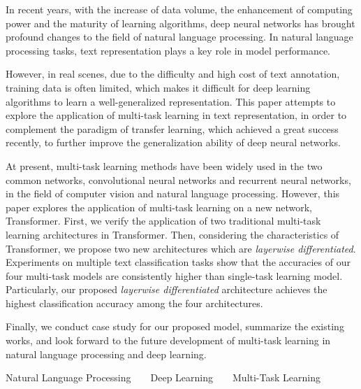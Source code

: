 \begin{eabstract}
	In recent years, with the increase of data volume, the enhancement of computing power and the maturity of learning algorithms, deep neural networks has brought profound changes to the field of natural language processing. In natural language processing tasks, text representation plays a key role in model performance.
	
	However, in real scenes, due to the difficulty and high cost of text annotation, training data is often limited, which makes it difficult for deep learning algorithms to learn a well-generalized representation. This paper attempts to explore the application of multi-task learning in text representation, in order to complement the paradigm of transfer learning, which achieved a great success recently, to further improve the generalization ability of deep neural networks.
	
	At present, multi-task learning methods have been widely used in the two common networks, convolutional neural networks and recurrent neural networks, in the field of computer vision and natural language processing. However, this paper explores the application of multi-task learning on a new network, Transformer. First, we verify the application of two traditional multi-task learning architectures in Transformer. Then, considering the characteristics of Transformer, we propose two new architectures which are \textit{layerwise differentiated}. Experiments on multiple text classification tasks show that the accuracies of our four multi-task models are consistently higher than single-task learning model. Particularly, our proposed \textit{layerwise differentiated} architecture achieves the highest classification accuracy among the four architectures.
	
	
	Finally, we conduct case study for our proposed model, summarize the existing works, and look forward to the future development of multi-task learning in natural language processing and deep learning.
	
	
\end{eabstract}


\begin{ekeywords}
	Natural Language Processing\ \ \ \ Deep Learning\ \ \ \ Multi-Task Learning
\end{ekeywords}

